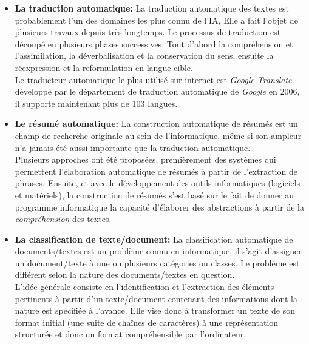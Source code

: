 \begin{itemize}
    \item \textbf{La traduction automatique:}
    La traduction automatique des textes est probablement l'un des domaines les plus connu de l'IA, Elle a fait l'objet de plusieurs travaux depuis très longtemps. Le processus de traduction est découpé en plusieurs phases successives. Tout d'abord la compréhension et l'assimilation, la déverbalisation et la conservation du sens, ensuite la réexpression et la reformulation en langue cible.\\
    Le traducteur automatique le plus utilisé sur internet est \emph{Google Translate} développé par le département de traduction automatique de \emph{Google} en 2006, il supporte maintenant plus de 103 langues.

    \item \textbf{Le résumé automatique:}
    La construction automatique de résumés est un champ de recherche originale au sein de l'informatique, même si son ampleur n'a jamais été aussi importante que la traduction automatique.\\
    Plusieurs approches ont été proposées, premièrement des systèmes qui permettent l'élaboration automatique de résumés à partir de l'extraction de phrases. Ensuite, et avec le développement des outils informatiques (logiciels et matériels), la construction de résumés s'est basé sur le fait de donner au programme informatique la capacité d'élaborer des abstractions à partir de la \emph{compréhension} des textes.

    \item \textbf{La classification de texte/document:}
    La classification automatique de documents/textes est un problème connu en informatique, il s'agit d'assigner un document/texte à une ou plusieurs catégories ou classes. Le problème est différent selon la nature des documents/textes en question.\\
    L'idée générale consiste en l'identification et l'extraction des éléments pertinents à partir d'un texte/document contenant des informations dont la nature est spécifiée à l'avance. Elle vise donc à transformer un texte de son format initial (une suite de chaînes de caractères) à une représentation structurée et donc un format compréhensible par l'ordinateur.\\
\end{itemize}

